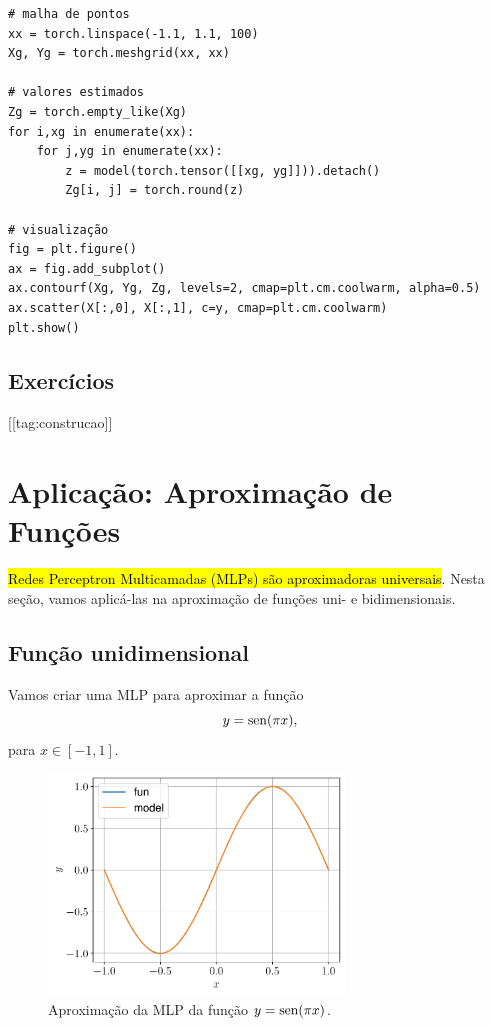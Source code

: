 \begin{lstlisting}
# malha de pontos
xx = torch.linspace(-1.1, 1.1, 100)
Xg, Yg = torch.meshgrid(xx, xx)

# valores estimados
Zg = torch.empty_like(Xg)
for i,xg in enumerate(xx):
    for j,yg in enumerate(xx):
        z = model(torch.tensor([[xg, yg]])).detach()
        Zg[i, j] = torch.round(z)

# visualização
fig = plt.figure()
ax = fig.add_subplot()
ax.contourf(Xg, Yg, Zg, levels=2, cmap=plt.cm.coolwarm, alpha=0.5)
ax.scatter(X[:,0], X[:,1], c=y, cmap=plt.cm.coolwarm)
plt.show()
\end{lstlisting}

\subsection{Exercícios}
[[tag:construcao]]


\section{Aplicação: Aproximação de Funções}\label{cap_mlp_sec_apfun}

\hl{Redes Perceptron Multicamadas (MLPs) são aproximadoras universais}. Nesta seção, vamos aplicá-las na aproximação de funções uni- e bidimensionais.

\subsection{Função unidimensional}

Vamos criar uma MLP para aproximar a função
\begin{equation}
  y = \operatorname{sen}(\pi x),
\end{equation}
para $x\in [-1,1]$.

\begin{figure}[H]
  \centering
  \includegraphics[width=0.7\textwidth]{cap_mlp/dados/fig_mlp_apfun_1d/fig}
  \caption{Aproximação da MLP da função $y = \operatorname{sen}(\pi x)$.}
  \label{fig:mlp_mlp_apfun_1d}
\end{figure}

